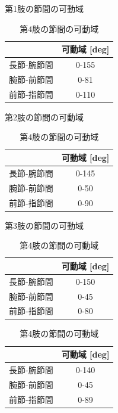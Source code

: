   \begin{table}[htbp]
  \begin{minipage}{0.5\hsize}
    \centering
    \caption{第1肢の節間の可動域}
    \label{tab:1kadou}
    \vspace{-3mm}
    \begin{tabular}{|l|c|}
    \hline
       & \multicolumn{1}{l|}{可動域 [deg]} \\ \hline
    長節-腕節間 & 0-155                         \\ \hline
    腕節-前節間 & 0-81                          \\ \hline
    前節-指節間 & 0-110                         \\ \hline
    \end{tabular}
  \end{minipage}
  \begin{minipage}{0.5\hsize}
    \centering
    \caption{第2肢の節間の可動域}
    \label{tab:2kadou}
    \vspace{-3mm}
    \begin{tabular}{|l|c|}
    \hline
       & \multicolumn{1}{l|}{可動域 [deg]} \\ \hline
    長節-腕節間 & 0-145                         \\ \hline
    腕節-前節間 & 0-50                          \\ \hline
    前節-指節間 & 0-90                          \\ \hline
    \end{tabular}
  \end{minipage}
  \begin{minipage}{0.5\hsize}
    \centering
    \vspace{5mm}
    \caption{第3肢の節間の可動域}
    \label{tab:3kadou}
    \vspace{-3mm}
    \begin{tabular}{|l|c|}
    \hline
       & \multicolumn{1}{l|}{可動域 [deg]} \\ \hline
    長節-腕節間 & 0-150                         \\ \hline
    腕節-前節間 & 0-45                          \\ \hline
    前節-指節間 & 0-80                          \\ \hline
    \end{tabular}
  \end{minipage}
  \begin{minipage}{0.5\hsize}
    \centering
    \vspace{5mm}
    \caption{第4肢の節間の可動域}
    \label{tab:4setukadou}
    \vspace{-3mm}
    \begin{tabular}{|l|c|}
    \hline
           & \multicolumn{1}{l|}{可動域 {[}deg{]}} \\ \hline
    長節-腕節間 & 0-140                            \\ \hline
    腕節-前節間 & 0-45                             \\ \hline
    前節-指節間 & 0-89                            \\ \hline
    \end{tabular}
  \end{minipage}
\end{table}
